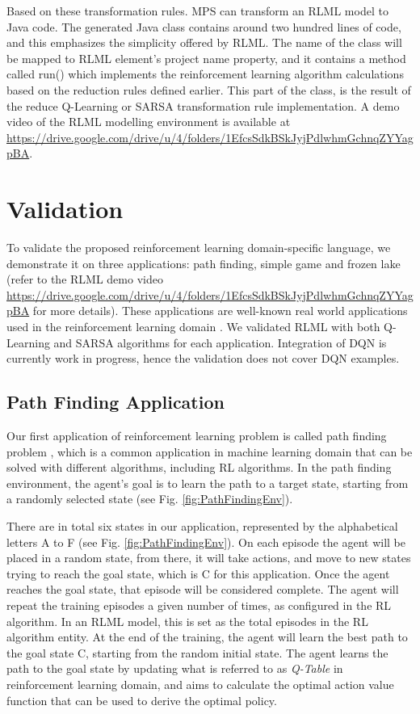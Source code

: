 \documentclass[11pt,letterpaper]{ryersonSGSThesis}
\begin{document}
\begin{ryersonSGSThesis}
         Based on these transformation rules. MPS can transform an RLML model to Java code. The generated Java class contains around two hundred lines of code, and this emphasizes the simplicity offered by RLML. The name of the class will be mapped to RLML element's project name property, and it contains a method called run() which implements the reinforcement learning algorithm calculations based on the reduction rules defined earlier. This part of the class, is the result of the reduce Q-Learning or SARSA transformation rule implementation. A demo video of the RLML modelling environment is available at \url{https://drive.google.com/drive/u/4/folders/1EfcsSdkBSkJyjPdlwhmGchnqZYYagpBA}.

\chapter{Validation}
\label{chap:validation}
    To validate the proposed reinforcement learning domain-specific language, we demonstrate it on three applications: path finding, simple game and frozen lake (refer to the RLML demo video \url{https://drive.google.com/drive/u/4/folders/1EfcsSdkBSkJyjPdlwhmGchnqZYYagpBA} for more details). These applications are well-known real world applications used in the reinforcement learning domain \cite{Ravichandiran2018}. We validated RLML with both Q-Learning and SARSA algorithms for each application. Integration of DQN is currently work in progress, hence the validation does not cover DQN examples.
    
    \section{Path Finding Application}
    Our first application of reinforcement learning problem is called path finding problem \cite{Verma2020}, which is a common application in machine learning domain that can be solved with different algorithms, including RL algorithms. In the path finding environment, the agent's goal is to learn the path to a target state, starting from a randomly selected state (see Fig. \ref{fig:PathFindingEnv}).
    
    There are in total six states in our application, represented by the alphabetical letters A to F (see Fig. \ref{fig:PathFindingEnv}). On each episode the agent will be placed in a random state, from there, it will take actions, and move to new states trying to reach the goal state, which is C for this application. Once the agent reaches the goal state, that episode will be considered complete. The agent will repeat the training episodes a given number of times, as configured in the RL algorithm. In an RLML model, this is set as the total episodes in the RL algorithm entity. At the end of the training, the agent will learn the best path to the goal state C, starting from the random initial state. The agent learns the path to the goal state by updating what is referred to as \emph{Q-Table} in reinforcement learning domain, and aims to calculate the optimal action value function that can be used to derive the optimal policy. 
    

\end{ryersonSGSThesis}
\end{document}
